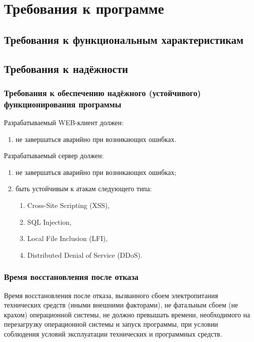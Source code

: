 \section{Требования к программе}

\subsection{Требования к функциональным характеристикам}



\subsection{Требования к надёжности}

\subsubsection{Требования к обеспечению надёжного (устойчивого) функционирования программы}

Разрабатываемый WEB-клиент должен:
\begin{enumerate}
    \item не завершаться аварийно при возникающих ошибках.
\end{enumerate}

Разрабатываемый сервер должен:
\begin{enumerate}
    \item не завершаться аварийно при возникающих ошибках;
    \item быть устойчивым к атакам следующего типа:
    \begin{enumerate}
        \item Cross-Site Scripting (XSS),
        \item SQL Injection,
        \item Local File Inclusion (LFI),
        \item Distributed Denial of Service (DDoS).
    \end{enumerate}
\end{enumerate}

\subsubsection{Время восстановления после отказа}
Время восстановления после отказа, вызванного сбоем электропитания технических средств (иными внешними факторами),
не фатальным сбоем (не крахом) операционной системы, не должно превышать времени, необходимого на перезагрузку
операционной системы и запуск программы, при условии соблюдения условий эксплуатации технических и программных средств.

